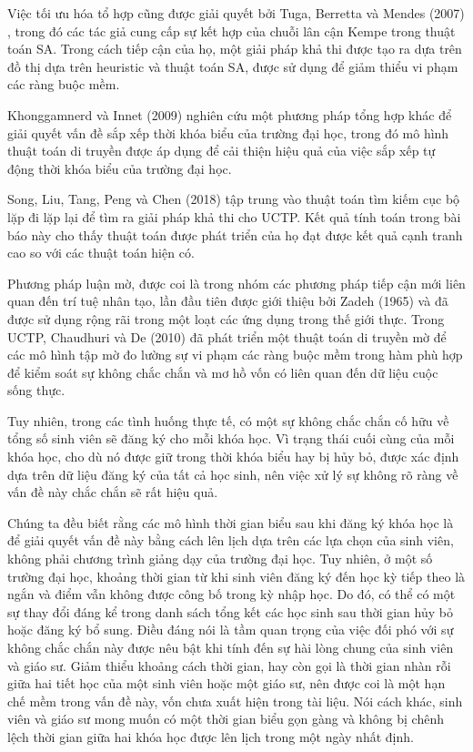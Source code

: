 \documentclass[11pt]{article}
\begin{document}
Việc tối ưu hóa tổ hợp cũng được giải quyết bởi Tuga, Berretta và Mendes (2007) \cite{Tuga:al:2007}, trong đó các tác giả cung cấp sự kết hợp của chuỗi lân cận Kempe trong thuật toán SA. Trong cách tiếp cận của họ, một giải pháp khả thi được tạo ra dựa trên đồ thị dựa trên heuristic và thuật toán SA, được sử dụng để giảm thiểu vi phạm các ràng buộc mềm. 

Khonggamnerd và Innet (2009) \cite{Khonggamnerd:Innet:2009} nghiên cứu một phương pháp tổng hợp khác để giải quyết vấn đề sắp xếp thời khóa biểu của trường đại học, trong đó mô hình thuật toán di truyền được áp dụng để cải thiện hiệu quả của việc sắp xếp tự động thời khóa biểu của trường đại học. 

Song, Liu, Tang, Peng và Chen (2018) \cite{Song:al:2018} tập trung vào thuật toán tìm kiếm cục bộ lặp đi lặp lại để tìm ra giải pháp khả thi cho UCTP. Kết quả tính toán trong bài báo này cho thấy thuật toán được phát triển của họ đạt được kết quả cạnh tranh cao so với các thuật toán hiện có.

Phương pháp luận mờ, được coi là trong nhóm các phương pháp tiếp cận mới liên quan đến trí tuệ nhân tạo, lần đầu tiên được giới thiệu bởi Zadeh (1965) \cite{Zadeh:1965} và đã được sử dụng rộng rãi trong một loạt các ứng dụng trong thế giới thực. Trong UCTP, Chaudhuri và De (2010) \cite{Chaudhuri:De:2010} đã phát triển một thuật toán di truyền mờ để các mô hình tập mờ đo lường sự vi phạm các ràng buộc mềm trong hàm phù hợp để kiểm soát sự không chắc chắn và mơ hồ vốn có liên quan đến dữ liệu cuộc sống thực.

Tuy nhiên, trong các tình huống thực tế, có một sự không chắc chắn cố hữu về tổng số sinh viên sẽ đăng ký cho mỗi khóa học. Vì trạng thái cuối cùng của mỗi khóa học, cho dù nó được giữ trong thời khóa biểu hay bị hủy bỏ, được xác định dựa trên dữ liệu đăng ký của tất cả học sinh, nên việc xử lý sự không rõ ràng về vấn đề này chắc chắn sẽ rất hiệu quả. 

Chúng ta đều biết rằng các mô hình thời gian biểu sau khi đăng ký khóa học là để giải quyết vấn đề này bằng cách lên lịch dựa trên các lựa chọn của sinh viên, không phải chương trình giảng dạy của trường đại học. Tuy nhiên, ở một số trường đại học, khoảng thời gian từ khi sinh viên đăng ký đến học kỳ tiếp theo là ngắn và điểm vẫn không được công bố trong kỳ nhập học. Do đó, có thể có một sự thay đổi đáng kể trong danh sách tổng kết  các học sinh sau thời gian hủy bỏ hoặc đăng ký bổ sung. Điều đáng nói là tầm quan trọng của việc đối phó với sự không chắc chắn này được nêu bật khi tính đến sự hài lòng chung của sinh viên và giáo sư. Giảm thiểu khoảng cách thời gian, hay còn gọi là thời gian nhàn rỗi giữa hai tiết học của một sinh viên hoặc một giáo sư, nên được coi là một hạn chế mềm trong vấn đề này, vốn chưa xuất hiện trong tài liệu. Nói cách khác, sinh viên và giáo sư mong muốn có một thời gian biểu gọn gàng và không bị chênh lệch thời gian giữa hai khóa học được lên lịch trong một ngày nhất định.
\end{document}
